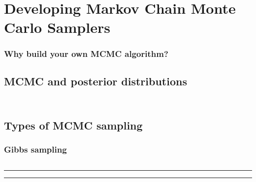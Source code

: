 \chapter{
Developing Markov Chain Monte Carlo Samplers
}
\label{chapt.mcmc}


\subsection{Why build your own MCMC algorithm?}



\section{MCMC and posterior distributions}

\begin{equation}
\label{mcmc.eq.bayes}
\end{equation}

\begin{equation}
\label{mcmc.eq.mu-posterior}
\end{equation}



\section{Types of MCMC sampling}


\subsection{Gibbs sampling}
\label{mcmc.sec.gibbs}

\begin{equation}
\label{mcmc.eq.sig-posterior}
\end{equation}

\begin{panel}[ht]
\centering
\rule[0.15in]{\textwidth}{.03in}
\rule[-0.15in]{\textwidth}{.03in}
\label{mcmc.panel.gibbs1}
\end{panel}



\begin{figure}[ht]
\begin{center}
\end{center}
\label{postdist.fig}
\end{figure}

\begin{figure}[ht]
\begin{center}
\end{center}
\label{plotsofPD.fig}
\end{figure}


